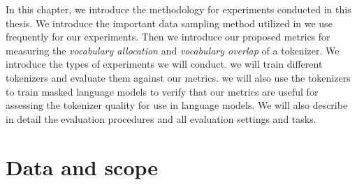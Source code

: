 

In this chapter, we introduce the methodology for experiments conducted in this thesis. We introduce the important data sampling method utilized in \citet{devlin_bert_2019,conneau_unsupervised_2020} we use frequently for our experiments.
Then we introduce our proposed metrics for measuring the \textit{vocabulary allocation} and \textit{vocabulary overlap} of a tokenizer. 
We introduce the types of experiments we will conduct. 
 we will train different tokenizers and evaluate them against our metrics.
 we will also use the tokenizers to train masked language models to verify that our metrics are useful for assessing the tokenizer quality for use in language models. We will also describe in detail the evaluation procedures and all evaluation settings and tasks. 



\section{Data and scope}
\label{sec:data_scope}



